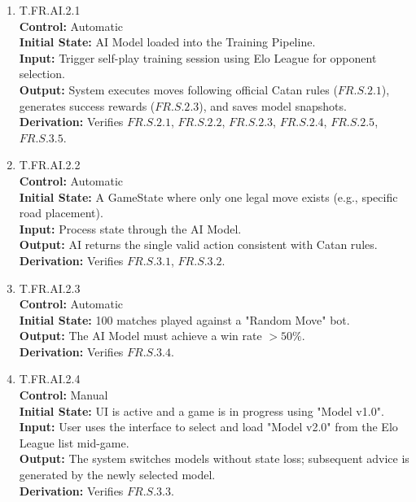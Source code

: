 \documentclass[12pt, titlepage]{article}
\begin{document}
\begin{enumerate}
    \item{\hypertarget{T.FR.AI.2.1}{T.FR.AI.2.1}\\}
    \textbf{Control:} Automatic \\
    \textbf{Initial State:} AI Model loaded into the Training Pipeline. \\
    \textbf{Input:} Trigger self-play training session using Elo League for opponent selection. \\
    \textbf{Output:} System executes moves following official Catan rules ($\hyperref[FR.S.2.1]{FR.S.2.1}$), generates success rewards ($\hyperref[FR.S.2.3]{FR.S.2.3}$), and saves model snapshots.\\
    \textbf{Derivation:} Verifies $\hyperref[FR.S.2.1]{FR.S.2.1}$, $\hyperref[FR.S.2.2]{FR.S.2.2}$, $\hyperref[FR.S.2.3]{FR.S.2.3}$, $\hyperref[FR.S.2.4]{FR.S.2.4}$, $\hyperref[FR.S.2.5]{FR.S.2.5}$, $\hyperref[FR.S.3.5]{FR.S.3.5}$.

    \item{\hypertarget{T.FR.AI.2.2}{T.FR.AI.2.2}\\}
    \textbf{Control:} Automatic \\
    \textbf{Initial State:} A GameState where only one legal move exists (e.g., specific road placement).\\
    \textbf{Input:} Process state through the AI Model. \\
    \textbf{Output:} AI returns the single valid action consistent with Catan rules. \\
    \textbf{Derivation:} Verifies $\hyperref[FR.S.3.1]{FR.S.3.1}$, $\hyperref[FR.S.3.2]{FR.S.3.2}$.

    \item{\hypertarget{T.FR.AI.2.3}{T.FR.AI.2.3}\\}
    \textbf{Control:} Automatic \\
    \textbf{Initial State:} 100 matches played against a "Random Move" bot. \\
    \textbf{Output:} The AI Model must achieve a win rate $>50\%$. \\
    \textbf{Derivation:} Verifies $\hyperref[FR.S.3.4]{FR.S.3.4}$.
    
    \item{\hypertarget{T.FR.AI.2.4}{T.FR.AI.2.4}\\}
    \textbf{Control:} Manual \\
    \textbf{Initial State:} UI is active and a game is in progress using "Model v1.0". \\
    \textbf{Input:} User uses the interface to select and load "Model v2.0" from the Elo League list mid-game. \\
    \textbf{Output:} The system switches models without state loss; subsequent advice is generated by the newly selected model. \\
    \textbf{Derivation:} Verifies $\hyperref[FR.S.3.3]{FR.S.3.3}$.
\end{enumerate}
\end{document}
